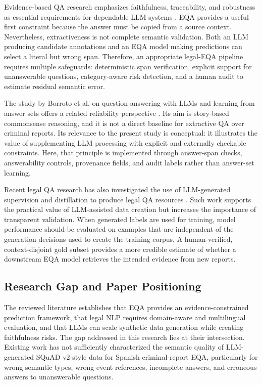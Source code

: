 \documentclass[graybox]{SNmult}
\begin{document}
Evidence-based QA research emphasizes faithfulness, traceability, and robustness as essential requirements for dependable LLM systems \cite{schimanski2024faithful}. EQA provides a useful first constraint because the answer must be copied from a source context. Nevertheless, extractiveness is not complete semantic validation. Both an LLM producing candidate annotations and an EQA model making predictions can select a literal but wrong span. Therefore, an appropriate legal-EQA pipeline requires multiple safeguards: deterministic span verification, explicit support for unanswerable questions, category-aware risk detection, and a human audit to estimate residual semantic error.

The study by Borroto et al. on question answering with LLMs and learning from answer sets offers a related reliability perspective \cite{borroto2025llm2las}. Its aim is story-based commonsense reasoning, and it is not a direct baseline for extractive QA over criminal reports. Its relevance to the present study is conceptual: it illustrates the value of supplementing LLM processing with explicit and externally checkable constraints. Here, that principle is implemented through answer-span checks, answerability controls, provenance fields, and audit labels rather than answer-set learning.

Recent legal QA research has also investigated the use of LLM-generated supervision and distillation to produce legal QA resources \cite{italiani2025aceattorney}. Such work supports the practical value of LLM-assisted data creation but increases the importance of transparent validation. When generated labels are used for training, model performance should be evaluated on examples that are independent of the generation decisions used to create the training corpus. A human-verified, context-disjoint gold subset provides a more credible estimate of whether a downstream EQA model retrieves the intended evidence from new reports.

\subsection{Research Gap and Paper Positioning}

The reviewed literature establishes that EQA provides an evidence-constrained prediction framework, that legal NLP requires domain-aware and multilingual evaluation, and that LLMs can scale synthetic data generation while creating faithfulness risks. The gap addressed in this research lies at their intersection. Existing work has not sufficiently characterized the semantic quality of LLM-generated SQuAD v2-style data for Spanish criminal-report EQA, particularly for wrong semantic types, wrong event references, incomplete answers, and erroneous answers to unanswerable questions.
\end{document}
